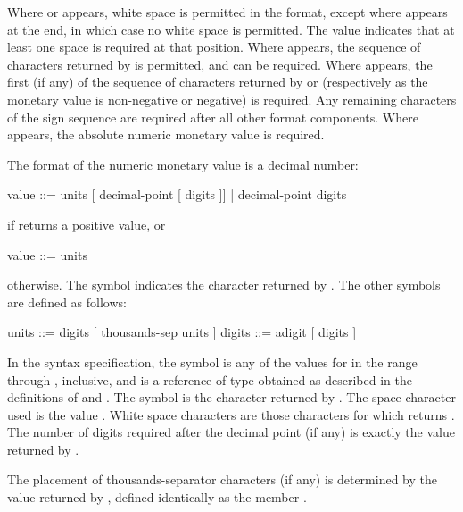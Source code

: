 \pnum
Where
or
appears, white space is permitted in the format,
except where
appears at the end, in which case no white space is permitted.
The value
indicates that at least one space is required at that position.
Where
appears, the sequence of characters returned by
is permitted, and can be required.
Where
appears, the first (if any) of the sequence of characters returned by
or
(respectively as the monetary value is non-negative or negative) is required.
Any remaining characters of the sign sequence are required after all
other format components.
Where
appears, the absolute numeric monetary value is required.

\pnum
The format of the numeric monetary value is a decimal number:

\begin{codeblock}
value ::= units [ decimal-point [ digits ]] |
  decimal-point digits
\end{codeblock}

if
returns a positive value, or

\begin{codeblock}
value ::= units
\end{codeblock}

otherwise.
The symbol
indicates the character returned by
.
The other symbols are defined as follows:

\begin{codeblock}
units ::= digits [ thousands-sep units ]
digits ::= adigit [ digits ]
\end{codeblock}

In the syntax specification, the symbol
is any of the values
for
in the range
through
,
inclusive, and
is a reference of type
obtained as described in the definitions of
and
.
The symbol
is the character returned by
.
The space character used is the value
.
White space characters are those characters
for which
returns
.
The number of digits required after the decimal point (if any)
is exactly the value returned by
.

\pnum
The placement of thousands-separator characters (if any)
is determined by the value returned by
,
defined identically as the member
.

